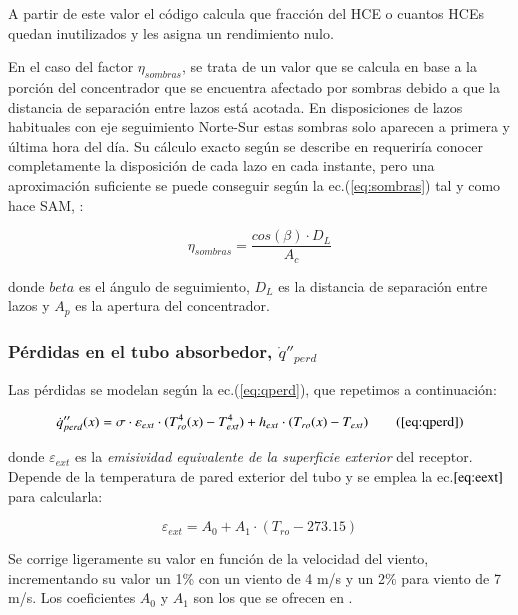 A partir de este valor el código calcula que fracción del HCE o cuantos HCEs quedan inutilizados y les asigna un rendimiento nulo.

En el caso del factor \(\eta_{sombras}\), se trata de un valor que se calcula en base a la porción del concentrador que se encuentra afectado por sombras debido a que la distancia de separación entre lazos está acotada. En disposiciones de lazos habituales con eje seguimiento Norte-Sur estas sombras solo aparecen a primera y última hora del día. Su cálculo exacto según se describe en \cite{sharmaShadingAvailableEnergy2013} requeriría conocer completamente la disposición de cada lazo en cada instante, pero una aproximación suficiente se puede conseguir según la ec.(\eqref{eq:sombras}) tal y como hace SAM, \cite{gilmanSolarAdvisorModel2008}:

\begin{equation}
   \eta_{sombras} =  \frac {cos(\beta) \cdot D_L}{A_c}
    \label{eq:sombras}
\end{equation}

donde $beta$ es el ángulo de seguimiento, $D_L$ es la distancia de separación entre lazos y $A_p$ es la apertura del concentrador.

\subsubsection{Pérdidas en el tubo absorbedor, $\dot q''_{perd}$}

Las pérdidas se modelan según la ec.(\ref{eq:qperd}), que repetimos a continuación:

\begin{equation}
\notag  \dot q''_{perd}(x)= \sigma \cdot \varepsilon_{ext} \cdot (T_{ro}^{4}(x)-T_{ext}^{4}) + h_{ext} \cdot (T_{ro}(x)-T_{ext}) \tag{\ref{eq:qperd}}
\end{equation}

donde   \(\varepsilon_{ext}\) es la \textit{emisividad equivalente de la superficie  exterior} del receptor. Depende de la temperatura de pared exterior del tubo y se emplea la ec.\(\eqref{eq:eext}\) para calcularla:

\begin{equation}
   \varepsilon_{ext} =  A_0 + A_1 \cdot  (T_{ro} - 273.15)
    \label{eq:eext}
\end{equation}

Se corrige ligeramente su valor en función de la velocidad del viento, incrementando su valor un 1\% con un viento de 4 m/s y un 2\% para viento de 7 m/s. Los coeficientes \(A_0\) y \(A_1\) son los que se ofrecen en \cite{barberofresnoDesarrolloModeloTeorico2018}.

